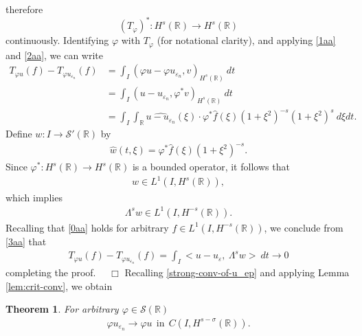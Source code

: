 \documentclass[12pt,reqno]{amsart}
\newcommand{\rr}{\mathbb{R}}
\newcommand{\ee}{\varepsilon}
\newcommand{\vp}{\varphi}
\theoremstyle{plain}  %
\newtheorem{theorem}{Theorem}
\theoremstyle{definition}
\begin{document}
		therefore 
		\begin{equation*}
			(T_\varphi)^*: H^s(\rr) \to H^s(\rr) 
		\end{equation*}
		continuously. Identifying
		$\varphi$ with $T_\varphi$ (for notational clarity), and 
		applying \eqref{1aa} and \eqref{2aa}, we can write
		\begin{equation}
			\begin{split}
				T_{\vp u}(f) - T_{\vp u_{\ee_n}}(f)
				& = \int_I (\vp u - \vp u_{\ee_n}, v)_{H^s(\rr)} \ dt
				\\
				& = \int_I (u - u_{\ee_n}, \vp^* v)_{H^s(\rr)} \ dt
				\\
				& = \int_I \int_\rr \widehat{u - u_{\ee_n}}(\xi) \cdot
				\vp^* \widehat{f}(\xi) (1+\xi^2)^{-s}(1 + \xi^2)^s \ d\xi
				dt.
				\label{3aa}
			\end{split}
		\end{equation}
		Define $w: I \to \mathcal{S'}(\rr)$ by
		\begin{equation*}
			\begin{split}
				\widehat{w}(t, \xi) = \vp^* \widehat{f}(\xi) (1 +
				\xi^2)^{-s}.
			\end{split}
		\end{equation*}
		Since $\vp^*: H^s(\rr) \to H^s(\rr)$ is a bounded operator, it follows that 
		\begin{equation*}
			\begin{split}
				w \in L^1(I, H^s(\rr)),
			\end{split}
		\end{equation*}
		which implies
		\begin{equation*}
			\begin{split}
				\Lambda^s w \in L^1(I, H^{-s}(\rr)).
			\end{split}
		\end{equation*}
		Recalling that \eqref{0aa} holds for arbitrary $f \in L^1(I,
		H^{-s}(\rr))$, we conclude from \eqref{3aa} that
		\begin{equation*}
			\begin{split}
				T_{\vp u}(f) - T_{\vp u_{\ee_n}}(f) = \int_I <u - u_\ee, \
				\Lambda^s w> \ dt \to 0
			\end{split}
		\end{equation*}
		completing the proof. $\quad \Box$
		\vskip0.1in
		Recalling \eqref{strong-conv-of-u_ep} and applying Lemma
		\ref{lem:crit-conv}, we obtain
		\begin{theorem}
			For arbitrary $\vp \in \mathcal{S}(\rr)$
			\label{thm:crit0}
			\begin{equation}
			\begin{split}
				\vp u_{\ee_n} \to \vp u \ \ \text{in}  \ \ C(I,
				H^{s-\sigma}(\rr)).
				\label{vp_u_ep_conv}
			\end{split}
		\end{equation}
	\end{theorem}
\end{document}
